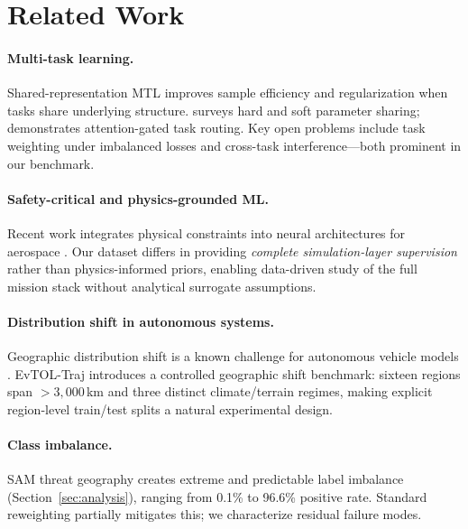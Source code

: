 \documentclass{article}
\theoremstyle{plain}
\theoremstyle{definition}
\begin{document}
\section{Related Work}
\label{sec:related}

\paragraph{Multi-task learning.}
Shared-representation MTL \citep{caruana1997multitask} improves sample
efficiency and regularization when tasks share underlying structure.
\citet{ruder2017overview} surveys hard and soft parameter sharing;
\citet{liu2019end} demonstrates attention-gated task routing.
Key open problems include task weighting under imbalanced losses
\citep{wu2020understanding} and cross-task interference---both
prominent in our benchmark.

\paragraph{Safety-critical and physics-grounded ML.}
Recent work integrates physical constraints into neural architectures for
aerospace \citep{reiss2024safety}.
Our dataset differs in providing \emph{complete simulation-layer supervision}
rather than physics-informed priors, enabling data-driven study of
the full mission stack without analytical surrogate assumptions.

\paragraph{Distribution shift in autonomous systems.}
Geographic distribution shift is a known challenge for autonomous
vehicle models \citep{ben2010theory,sagawa2020distributionally}.
EvTOL-Traj introduces a controlled geographic shift benchmark: sixteen
regions span $> 3{,}000$\,km and three distinct climate/terrain regimes,
making explicit region-level train/test splits a natural experimental design.

\paragraph{Class imbalance.}
SAM threat geography creates extreme and predictable label imbalance
(Section~\ref{sec:analysis}), ranging from 0.1\% to 96.6\% positive rate.
Standard reweighting \citep{he2009learning} partially mitigates this;
we characterize residual failure modes.
\end{document}
